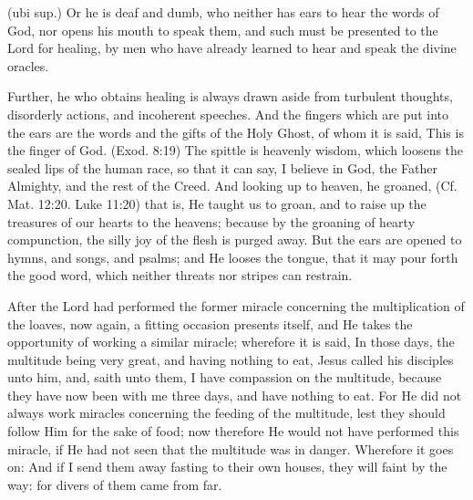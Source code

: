  (ubi sup.) Or he is deaf and dumb, who neither has ears to hear the words of God, nor opens his mouth to speak them, and such must be presented to the Lord for healing, by men who have already learned to hear and speak the divine oracles.

 Further, he who obtains healing is always drawn aside from turbulent thoughts, disorderly actions, and incoherent speeches. And the fingers which are put into the ears are the words and the gifts of the Holy Ghost, of whom it is said, This is the finger of God. (Exod. 8:19) The spittle is heavenly wisdom, which loosens the sealed lips of the human race, so that it can say, I believe in God, the Father Almighty, and the rest of the Creed. And looking up to heaven, he groaned, (Cf. Mat. 12:20. Luke 11:20) that is, He taught us to groan, and to raise up the treasures of our hearts to the heavens; because by the groaning of hearty compunction, the silly joy of the flesh is purged away. But the ears are opened to hymns, and songs, and psalms; and He looses the tongue, that it may pour forth the good word, which neither threats nor stripes can restrain.


 

 After the Lord had performed the former miracle concerning the multiplication of the loaves, now again, a fitting occasion presents itself, and He takes the opportunity of working a similar miracle; wherefore it is said, In those days, the multitude being very great, and having nothing to eat, Jesus called his disciples unto him, and, saith unto them, I have compassion on the multitude, because they have now been with me three days, and have nothing to eat. For He did not always work miracles concerning the feeding of the multitude, lest they should follow Him for the sake of food; now therefore He would not have performed this miracle, if He had not seen that the multitude was in danger. Wherefore it goes on: And if I send them away fasting to their own houses, they will faint by the way: for divers of them came from far.

